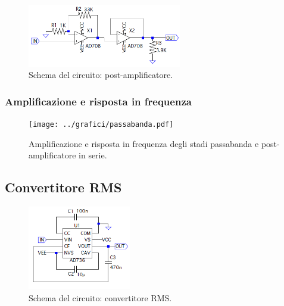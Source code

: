 \documentclass[a4paper,10pt]{article}
\begin{document}
\lipsum[4-5]

\begin{figure}
	\vspace{-10pt}
	\centering
	\includegraphics[width=0.6\textwidth]{../grafici/PostAmp.png}
	\vspace{-12pt}
	\caption{Schema del circuito: post-amplificatore.}
	\label{fig:powamp}
	\vspace{-6pt}
\end{figure}

\lipsum[6-7]


\subsubsection*{Amplificazione e risposta in frequenza}

\lipsum[4]

\begin{figure}[H]
	\centering
	\texttt{[image: ../grafici/passabanda.pdf]}
	\vspace*{10pt}
	\caption{Amplificazione e risposta in frequenza degli stadi passabanda e post-amplificatore in serie.}
	\label{fig:blocks}
\end{figure}

\subsection{Convertitore RMS}

\begin{figure}
	\vspace{-10pt}
	\centering
	\includegraphics[width=0.4\textwidth]{../grafici/RMSconverter.png}
	\vspace{-12pt}
	\caption{Schema del circuito: convertitore RMS.}
	\label{fig:powamp}
	\vspace{-6pt}
\end{figure}
\end{document}
